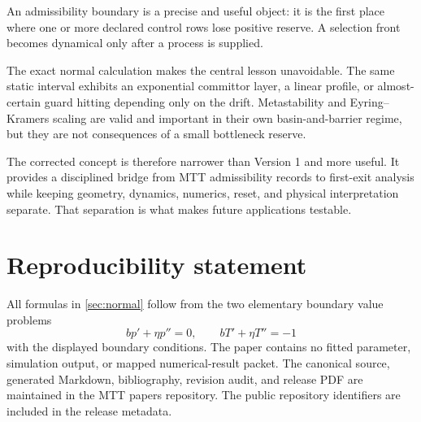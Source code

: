 \documentclass[11pt]{article}
\theoremstyle{definition}
\theoremstyle{remark}
\begin{document}
An admissibility boundary is a precise and useful object: it is the first
place where one or more declared control rows lose positive reserve.  A
selection front becomes dynamical only after a process is supplied.

The exact normal calculation makes the central lesson unavoidable.  The
same static interval exhibits an exponential committor layer, a linear
profile, or almost-certain guard hitting depending only on the drift.
Metastability and Eyring--Kramers scaling are valid and important in their
own basin-and-barrier regime, but they are not consequences of a small
bottleneck reserve.

The corrected concept is therefore narrower than Version 1 and more useful.
It provides a disciplined bridge from MTT admissibility records to
first-exit analysis while keeping geometry, dynamics, numerics, reset, and
physical interpretation separate.  That separation is what makes future
applications testable.

\section*{Reproducibility statement}

All formulas in \cref{sec:normal} follow from the two elementary boundary
value problems
\[
 bp'+\eta p''=0,
 \qquad
 bT'+\eta T''=-1
\]
with the displayed boundary conditions.  The paper contains no fitted
parameter, simulation output, or mapped numerical-result packet.  The
canonical source, generated Markdown, bibliography, revision audit, and
release PDF are maintained in the MTT papers repository.  The public
repository identifiers are included in the release metadata.



\end{document}
